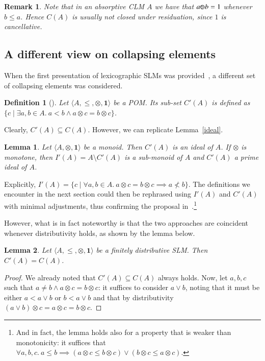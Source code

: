 \documentclass[a4paper]{elsarticle}
\newtheorem{definition}{Definition}
\newtheorem{remark}{Remark}
\newtheorem{lemma}{Lemma}
\newcommand{\monop}{\otimes}
\newcommand{\1}{\mathbf{1}}
\def\odiv{{ \ominus\hspace{-8pt}:}\;}
\begin{document}
\begin{remark}
	Note that in an absorptive CLM $A$ we have that $a \odiv b = 1$ 
	whenever $b \leq a$. Hence $C(A)$ is usually not closed under residuation, since 
	$1$ is cancellative.
\end{remark}

\subsection{A different view on collapsing elements}

When the first presentation of lexicographic 
SLMs was provided~\cite{GadducciHMW13}, a different 
set of collapsing elements was considered.

\begin{definition}[\cite{GadducciHMW13}]
	Let $\langle A, \leq, \monop, \1 \rangle$ be a POM. Its sub-set $C'(A)$ 
	is defined as 
	$\{ c \mid \exists a, b \in A.\ a < b \wedge a \otimes c = b \otimes c\}$.
\end{definition}

Clearly, $C'(A) \subseteq C(A)$. However, we can replicate Lemma~\ref{ideal}.
%

\begin{lemma}
	Let $\langle A, \monop, \1 \rangle$ be a monoid.
	Then $C'(A)$ is an ideal of $A$.
	If $\monop$ is monotone, then 
	$I'(A) = A \setminus C'(A) $ is a sub-monoid of $A$
	and $C'(A)$ a prime ideal of $A$.
\end{lemma}

Explicitly, $I'(A) = \{ c \mid \forall a, b \in A.\ a \otimes c = b \otimes c \implies a \not < b \}$.
%
The definitions we encounter in the next section 
could then be rephrased using 
$I'(A)$ and $C'(A)$ with minimal adjustments, thus confirming the proposal
in~\cite{GadducciHMW13}.\footnote{And in fact, the lemma holds also for 
	a property that is weaker than monotonicity: it suffices that 
	$\forall a, b, c.\ a \leq b \implies (a \otimes c \leq b \otimes c) \vee (b \otimes c \leq a \otimes c)$.
}

However, what is in fact noteworthy is that the two approaches are coincident
whenever distributivity holds, as shown by the lemma below.

\begin{lemma}
	Let $\langle A, \leq, \monop, \1 \rangle$ be a finitely distributive SLM.
	Then $C'(A) = C(A)$.
\end{lemma}
\begin{proof}
	We already noted that $C'(A) \subseteq C(A)$ always holds. Now, let $a, b, c$ such that
	$a \neq b \wedge a \otimes c = b \otimes c$: it suffices to consider $a \vee b$, noting 
	that it must be either $a < a \vee b$ or $b < a \vee b$ and that by distributivity 
	$(a \vee b) \otimes c = a \otimes c = b \otimes c$.
\end{proof}
\end{document}
